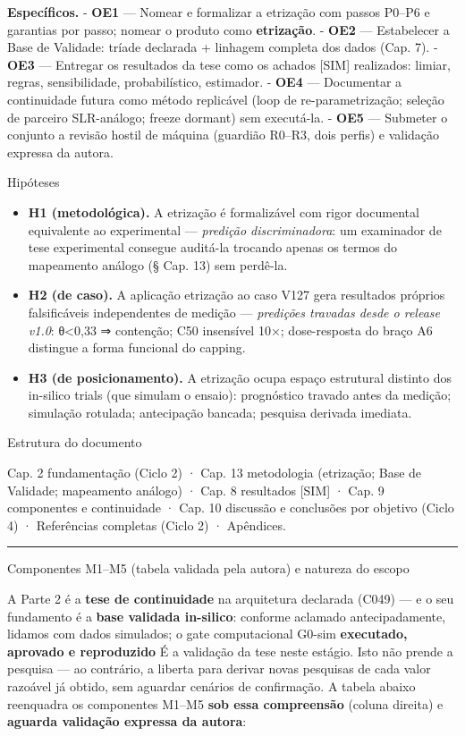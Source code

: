 \documentclass[12pt,a4paper,oneside]{report}
\providecommand{\tightlist}{\setlength{\itemsep}{2pt}\setlength{\parskip}{0pt}}
\begin{document}
\textbf{Específicos.} - \textbf{OE1} --- Nomear e formalizar a etrização
com passos P0--P6 e garantias por passo; nomear o produto como
\textbf{etrização}. - \textbf{OE2} --- Estabelecer a Base de Validade:
tríade declarada + linhagem completa dos dados (Cap. 7). - \textbf{OE3}
--- Entregar os resultados da tese como os achados {[}SIM{]} realizados:
limiar, regras, sensibilidade, probabilístico, estimador. - \textbf{OE4}
--- Documentar a continuidade futura como método replicável (loop de
re-parametrização; seleção de parceiro SLR-análogo; freeze dormant) sem
executá-la. - \textbf{OE5} --- Submeter o conjunto a revisão hostil de
máquina (guardião R0--R3, dois perfis) e validação expressa da autora.

Hipóteses

\begin{itemize}
\tightlist
\item
  \textbf{H1 (metodológica).} A etrização é formalizável com rigor
  documental equivalente ao experimental --- \emph{predição
  discriminadora}: um examinador de tese experimental consegue auditá-la
  trocando apenas os termos do mapeamento análogo (§ Cap. 13) sem
  perdê-la.
\item
  \textbf{H2 (de caso).} A aplicação etrização ao caso V127 gera
  resultados próprios falsificáveis independentes de medição ---
  \emph{predições travadas desde o release v1.0}: θ\textless0,33 ⇒
  contenção; C50 insensível 10×; dose-resposta do braço A6 distingue a
  forma funcional do capping.
\item
  \textbf{H3 (de posicionamento).} A etrização ocupa espaço estrutural
  distinto dos in-silico trials (que simulam o ensaio): prognóstico
  travado antes da medição; simulação rotulada; antecipação bancada;
  pesquisa derivada imediata.
\end{itemize}

Estrutura do documento

Cap. 2 fundamentação (Ciclo 2) · Cap. 13 metodologia (etrização; Base de
Validade; mapeamento análogo) · Cap. 8 resultados {[}SIM{]} · Cap. 9
componentes e continuidade · Cap. 10 discussão e conclusões por objetivo
(Ciclo 4) · Referências completas (Ciclo 2) · Apêndices.

\begin{center}\rule{0.5\linewidth}{0.5pt}\end{center}

Componentes M1--M5 (tabela validada pela autora) e natureza do escopo

A Parte 2 é a \textbf{tese de continuidade} na arquitetura declarada
(C049) --- e o seu fundamento é a \textbf{base validada in-silico}:
conforme aclamado antecipadamente, lidamos com dados simulados; o gate
computacional G0-sim \textbf{executado, aprovado e reproduzido} É a
validação da tese neste estágio. Isto não prende a pesquisa --- ao
contrário, a liberta para derivar novas pesquisas de cada valor razoável
já obtido, sem aguardar cenários de confirmação. A tabela abaixo
reenquadra os componentes M1--M5 \textbf{sob essa compreensão} (coluna
direita) e \textbf{aguarda validação expressa da autora}:
\end{document}
